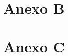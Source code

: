 \documentclass[oneside,11pt]{Latex/Classes/PhDthesisPSnPDF}
\begin{document}
\chapter{Anexo B}

\chapter{Anexo C}

\renewcommand{\bibname}{Lista de Referencias}
 
 

\end{document}
